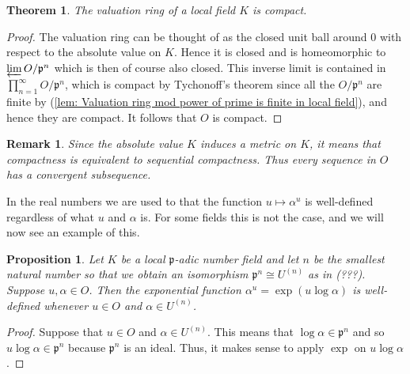 \documentclass{article}
\newtheorem{theorem}{Theorem}[section]
\newtheorem{proposition}{Proposition}[section]
\newtheorem{remark}{Remark}[section]
\newcommand{\mfrak}[1]{\mathfrak{#1}}
\begin{document}
\begin{theorem} \label{thm: Valuation ring in local field is compact}
    The valuation ring of a local field $K$ is compact.
\end{theorem}
\begin{proof}
    The valuation ring can be thought of as the closed unit ball around 0 with respect to the absolute value on $K$. Hence it is closed and is homeomorphic to $\varprojlim O / \mfrak p^n$ which is then of course also closed. This inverse limit is contained in $\prod_{n = 1}^\infty O / \mfrak p^n$, which is compact by Tychonoff's theorem since all the $O / \mfrak p^n$ are finite by (\ref{lem: Valuation ring mod power of prime is finite in local field}), and hence they are compact. It follows that $O$ is compact.
\end{proof}
\begin{remark}\label{rem: Compactness is equivalent to sequential compactness}
    Since the absolute value $K$ induces a metric on $K$, it means that compactness is equivalent to sequential compactness. Thus every sequence in $O$ has a convergent subsequence.
\end{remark}

In the real numbers we are used to that the function $u \mapsto \alpha^u$ is well-defined regardless of what $u$ and $\alpha$ is. For some fields this is not the case, and we will now see an example of this. 

\begin{proposition}
    Let $K$ be a local $\mfrak p$-adic number field and let $n$ be the smallest natural number so that we obtain an isomorphism $\mfrak p^n \cong U^{(n)}$ as in (???). Suppose $u,\alpha \in O$. Then the exponential function $\alpha^u = \exp(u \log \alpha)$ is well-defined whenever $u \in O$ and $\alpha \in U^{(n)}$.
\end{proposition}
\begin{proof}
    Suppose that $u \in O$ and $\alpha \in U^{(n)}$. This means that $\log \alpha \in \mfrak p^n$ and so $u \log \alpha \in \mfrak p^n$ because $\mfrak p^n$ is an ideal. Thus, it makes sense to apply $\exp$ on $u \log \alpha$.
\end{proof}
\end{document}
